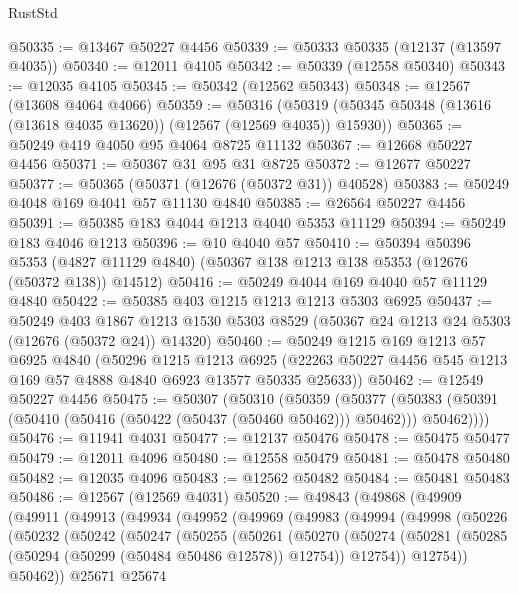 \begin{lexlean}{RustStd}
\begin{coremodule}
@50335 := @13467 @50227 @4456
@50339 := @50333 @50335 (@12137 (@13597 @4035))
@50340 := @12011 @4105
@50342 := @50339 (@12558 @50340)
@50343 := @12035 @4105
@50345 := @50342 (@12562 @50343)
@50348 := @12567 (@13608 @4064 @4066)
@50359 := @50316
    (@50319 (@50345 @50348 (@13616 (@13618 @4035 @13620)) (@12567 (@12569 @4035)) @15930))
@50365 := @50249 @419 @4050 @95 @4064 @8725 @11132
@50367 := @12668 @50227 @4456
@50371 := @50367 @31 @95 @31 @8725
@50372 := @12677 @50227
@50377 := @50365 (@50371 (@12676 (@50372 @31)) @40528)
@50383 := @50249 @4048 @169 @4041 @57 @11130 @4840
@50385 := @26564 @50227 @4456
@50391 := @50385 @183 @4044 @1213 @4040 @5353 @11129
@50394 := @50249 @183 @4046 @1213
@50396 := @10 @4040 @57
@50410 := @50394
    @50396
    @5353
    (@4827 @11129 @4840)
    (@50367 @138 @1213 @138 @5353 (@12676 (@50372 @138)) @14512)
@50416 := @50249 @4044 @169 @4040 @57 @11129 @4840
@50422 := @50385 @403 @1215 @1213 @1213 @5303 @6925
@50437 := @50249
    @403
    @1867
    @1213
    @1530
    @5303
    @8529
    (@50367 @24 @1213 @24 @5303 (@12676 (@50372 @24)) @14320)
@50460 := @50249
    @1215
    @169
    @1213
    @57
    @6925
    @4840
    (@50296
      @1215
      @1213
      @6925
      (@22263 @50227 @4456 @545 @1213 @169 @57 @4888 @4840 @6923 @13577 @50335 @25633))
@50462 := @12549 @50227 @4456
@50475 := @50307
    (@50310
      (@50359
        (@50377
          (@50383 (@50391 (@50410 (@50416 (@50422 (@50437 (@50460 @50462))) @50462))) @50462))))
@50476 := @11941 @4031
@50477 := @12137 @50476
@50478 := @50475 @50477
@50479 := @12011 @4096
@50480 := @12558 @50479
@50481 := @50478 @50480
@50482 := @12035 @4096
@50483 := @12562 @50482
@50484 := @50481 @50483
@50486 := @12567 (@12569 @4031)
@50520 := @49843
    (@49868
      (@49909
        (@49911
          (@49913
            (@49934
              (@49952
                (@49969
                  (@49983
                    (@49994
                      (@49998
                        (@50226
                          (@50232
                            (@50242
                              (@50247
                                (@50255
                                  (@50261
                                    (@50270
                                      (@50274
                                        (@50281
                                          (@50285 (@50294 (@50299 (@50484 @50486 @12578)) @12754))
                                          @12754))
                                      @12754))
                                  @50462))
                              @25671
                              @25674

\end{coremodule}
\end{lexlean}
